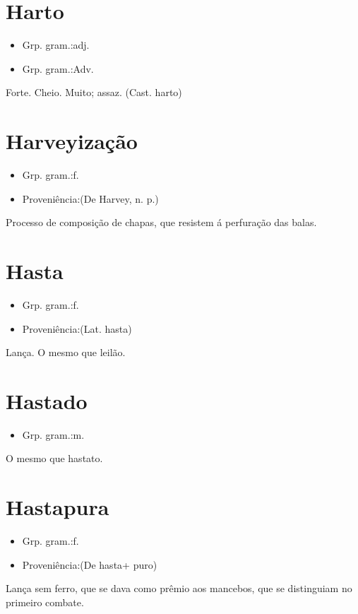 \documentclass{article}
\begin{document}
\section{Harto}
\begin{itemize}
\item {Grp. gram.:adj.}
\end{itemize}
\begin{itemize}
\item {Grp. gram.:Adv.}
\end{itemize}
Forte.
Cheio.
Muito; assaz.
(Cast. \textunderscore harto\textunderscore )
\section{Harveyização}
\begin{itemize}
\item {Grp. gram.:f.}
\end{itemize}
\begin{itemize}
\item {Proveniência:(De \textunderscore Harvey\textunderscore , n. p.)}
\end{itemize}
Processo de composição de chapas, que resistem á perfuração das balas.
\section{Hasta}
\begin{itemize}
\item {Grp. gram.:f.}
\end{itemize}
\begin{itemize}
\item {Proveniência:(Lat. \textunderscore hasta\textunderscore )}
\end{itemize}
Lança.
O mesmo que \textunderscore leilão\textunderscore .
\section{Hastado}
\begin{itemize}
\item {Grp. gram.:m.}
\end{itemize}
O mesmo que \textunderscore hastato\textunderscore .
\section{Hastapura}
\begin{itemize}
\item {Grp. gram.:f.}
\end{itemize}
\begin{itemize}
\item {Proveniência:(De \textunderscore hasta\textunderscore  + \textunderscore puro\textunderscore )}
\end{itemize}
Lança sem ferro, que se dava como prêmio aos mancebos, que se distinguiam no primeiro combate.
\end{document}
